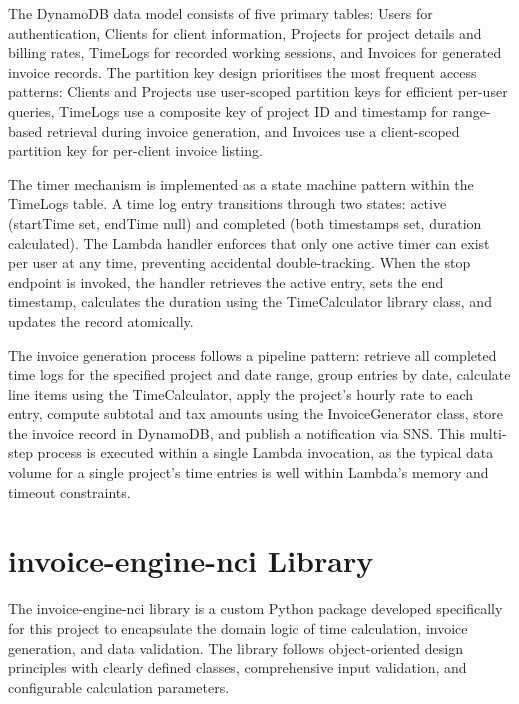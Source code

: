 \documentclass[conference]{IEEEtran}
\begin{document}
The DynamoDB data model consists of five primary tables: Users for authentication, Clients for client information, Projects for project details and billing rates, TimeLogs for recorded working sessions, and Invoices for generated invoice records. The partition key design prioritises the most frequent access patterns: Clients and Projects use user-scoped partition keys for efficient per-user queries, TimeLogs use a composite key of project ID and timestamp for range-based retrieval during invoice generation, and Invoices use a client-scoped partition key for per-client invoice listing.

The timer mechanism is implemented as a state machine pattern within the TimeLogs table. A time log entry transitions through two states: active (startTime set, endTime null) and completed (both timestamps set, duration calculated). The Lambda handler enforces that only one active timer can exist per user at any time, preventing accidental double-tracking. When the stop endpoint is invoked, the handler retrieves the active entry, sets the end timestamp, calculates the duration using the TimeCalculator library class, and updates the record atomically.

The invoice generation process follows a pipeline pattern: retrieve all completed time logs for the specified project and date range, group entries by date, calculate line items using the TimeCalculator, apply the project's hourly rate to each entry, compute subtotal and tax amounts using the InvoiceGenerator class, store the invoice record in DynamoDB, and publish a notification via SNS. This multi-step process is executed within a single Lambda invocation, as the typical data volume for a single project's time entries is well within Lambda's memory and timeout constraints.

\section{invoice-engine-nci Library}

The invoice-engine-nci library is a custom Python package developed specifically for this project to encapsulate the domain logic of time calculation, invoice generation, and data validation. The library follows object-oriented design principles with clearly defined classes, comprehensive input validation, and configurable calculation parameters.
\end{document}
